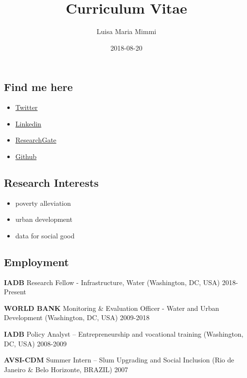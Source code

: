 \documentclass[]{article}
\title{Curriculum Vitae}
\author{Luisa Maria Mimmi}
\date{2018-08-20}
\providecommand{\tightlist}{%
  \setlength{\itemsep}{0pt}\setlength{\parskip}{0pt}}
\begin{document}
\maketitle

\hypertarget{find-me-here}{%
\subsection{Find me here}\label{find-me-here}}

\begin{itemize}
\tightlist
\item
  \href{https://twitter.com/Lulliter/}{Twitter}
\item
  \href{https://www.linkedin.com/in/luisa-m-mimmi/}{Linkedin}
\item
  \href{https://www.researchgate.net/profile/Luisa_Mimmi}{ResearchGate}\\
\item
  \href{https://github.com/Lulliter}{Github}
\end{itemize}

\hypertarget{research-interests}{%
\subsection{Research Interests}\label{research-interests}}

\begin{itemize}
\tightlist
\item
  poverty alleviation
\item
  urban development
\item
  data for social good
\end{itemize}

\hypertarget{employment}{%
\subsection{Employment}\label{employment}}

\textbf{IADB} Research Fellow - Infrastructure, Water (Washington, DC,
USA) \hfill 2018-Present

\textbf{WORLD BANK} Monitoring \& Evaluation Officer - Water and Urban
Development (Washington, DC, USA) \hfill 2009-2018

\textbf{IADB} Policy Analyst -- Entrepreneurship and vocational training
(Washington, DC, USA) \hfill 2008-2009

\textbf{AVSI-CDM} Summer Intern -- Slum Upgrading and Social Inclusion
(Rio de Janeiro \& Belo Horizonte, BRAZIL) \hfill 2007
\end{document}
